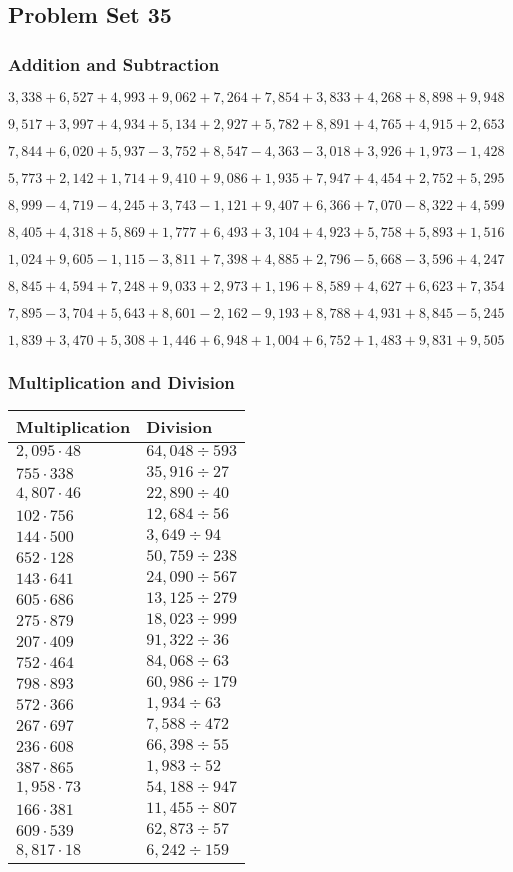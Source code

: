 \hypertarget{problem-set-35-3}{%
\subsection{Problem Set 35}\label{problem-set-35-3}}

\hypertarget{addition-and-subtraction-197}{%
\subsubsection{Addition and
Subtraction}\label{addition-and-subtraction-197}}

\(3,338+6,527+4,993+9,062+7,264+7,854+3,833+4,268+8,898+ 9,948\)

\(9,517+3,997+4,934+5,134+2,927+5,782+8,891+4,765+4,915+2,653\)

\(7,844+6,020+5,937-3,752+8,547-4,363-3,018+3,926+1,973-1,428\)

\(5,773+2,142+1,714+9,410+9,086+1,935+7,947+4,454+2,752+5,295\)

\(8,999-4,719-4,245+3,743-1,121+9,407+6,366+7,070-8,322+4,599\)

\(8,405+4,318+5,869+1,777+6,493+3,104+4,923+5,758+5,893+1,516\)

\(1,024+9,605-1,115-3,811+7,398+4,885+2,796-5,668-3,596+4,247\)

\(8,845+4,594+7,248+9,033+2,973+1,196+8,589+4,627+6,623+7,354\)

\(7,895-3,704+5,643+8,601-2,162-9,193+8,788+4,931+8,845-5,245\)

\(1,839+3,470+5,308+1,446+6,948+1,004+6,752+1,483+9,831+9,505\)

\hypertarget{multiplication-and-division-196}{%
\subsubsection{Multiplication and
Division}\label{multiplication-and-division-196}}

\begin{longtable}[]{@{}ll@{}}
\toprule
Multiplication & Division\tabularnewline
\midrule
\endhead
\(2,095\cdot48\) & \(64,048÷593\)\tabularnewline
\(755\cdot338\) & \(35,916÷27\)\tabularnewline
\(4,807\cdot46\) & \(22,890÷40\)\tabularnewline
\(102\cdot756\) & \(12,684÷56\)\tabularnewline
\(144\cdot500\) & \(3,649÷94\)\tabularnewline
\(652\cdot128\) & \(50,759÷238\)\tabularnewline
\(143\cdot641\) & \(24,090÷567\)\tabularnewline
\(605\cdot686\) & \(13,125÷279\)\tabularnewline
\(275\cdot879\) & \(18,023÷999\)\tabularnewline
\(207\cdot409\) & \(91,322÷36\)\tabularnewline
\(752\cdot464\) & \(84,068÷63\)\tabularnewline
\(798\cdot893\) & \(60,986÷179\)\tabularnewline
\(572\cdot366\) & \(1,934÷63\)\tabularnewline
\(267\cdot697\) & \(7,588÷472\)\tabularnewline
\(236\cdot608\) & \(66,398÷55\)\tabularnewline
\(387\cdot865\) & \(1,983÷52\)\tabularnewline
\(1,958\cdot73\) & \(54,188÷947\)\tabularnewline
\(166\cdot381\) & \(11,455÷807\)\tabularnewline
\(609\cdot539\) & \(62,873÷57\)\tabularnewline
\(8,817\cdot18\) & \(6,242÷159\)\tabularnewline
\bottomrule
\end{longtable}

